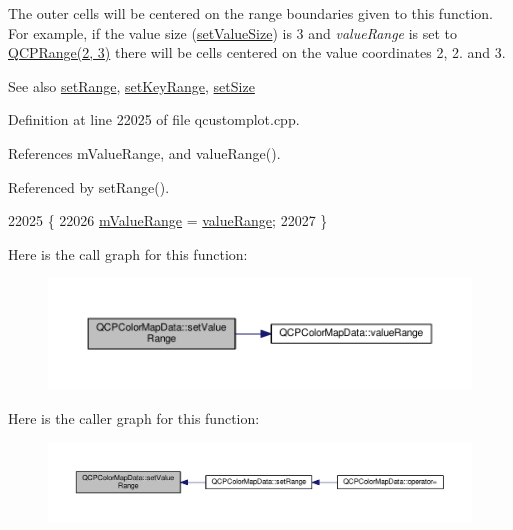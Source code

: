 The outer cells will be centered on the range boundaries given to this function. For example, if the value size (\hyperlink{class_q_c_p_color_map_data_a0893c9e3914513048b45e3429ffd16f2}{set\+Value\+Size}) is 3 and {\itshape value\+Range} is set to {\ttfamily \hyperlink{class_q_c_p_range}{Q\+C\+P\+Range(2, 3)}} there will be cells centered on the value coordinates 2, 2. and 3.

\begin{DoxySeeAlso}{See also}
\hyperlink{class_q_c_p_color_map_data_aad9c1c7c703c1339489fc730517c83d4}{set\+Range}, \hyperlink{class_q_c_p_color_map_data_a0738c485f3c9df9ea1241b7a8bb6a86e}{set\+Key\+Range}, \hyperlink{class_q_c_p_color_map_data_a0d9ff35c299d0478b682bfbcdd9c097e}{set\+Size} 
\end{DoxySeeAlso}


Definition at line 22025 of file qcustomplot.\+cpp.



References m\+Value\+Range, and value\+Range().



Referenced by set\+Range().


\begin{DoxyCode}
22025                                                               \{
22026   \hyperlink{class_q_c_p_color_map_data_a225bb96f10c1a27b51ae59249477dbef}{mValueRange} = \hyperlink{class_q_c_p_color_map_data_a025be4d7ba0494fd7b38a5a56c737f2a}{valueRange};
22027 \}
\end{DoxyCode}


Here is the call graph for this function\+:\nopagebreak
\begin{figure}[H]
\begin{center}
\leavevmode
\includegraphics[width=350pt]{class_q_c_p_color_map_data_ada1b2680ba96a5f4175b6d341cf75d23_cgraph}
\end{center}
\end{figure}




Here is the caller graph for this function\+:\nopagebreak
\begin{figure}[H]
\begin{center}
\leavevmode
\includegraphics[width=350pt]{class_q_c_p_color_map_data_ada1b2680ba96a5f4175b6d341cf75d23_icgraph}
\end{center}
\end{figure}


